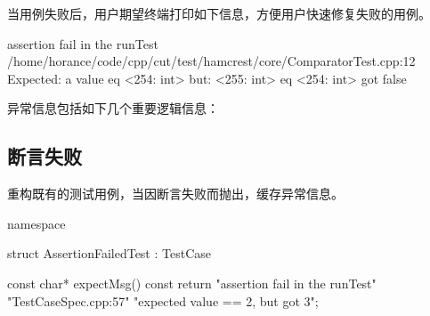 \begin{content}

当用例失败后，用户期望终端打印如下信息，方便用户快速修复失败的用例。

\begin{leftbar}
 \begin{c++}[caption={\ttfamily{include/mars/except/TestFailure.h}}]
assertion fail in the runTest
/home/horance/code/cpp/cut/test/hamcrest/core/ComparatorTest.cpp:12
Expected: a value eq <254: int>
     but: <255: int> eq <254: int> got false
 \end{c++}
\end{leftbar}

异常信息包括如下几个重要逻辑信息：

\begin{enum}
    \begin{enum}
    \end{enum}
    \begin{enum}
    \end{enum}
    \begin{enum}
    \end{enum}
\end{enum}

\subsection{断言失败}

重构既有的测试用例，当因断言失败而抛出，缓存异常信息。

\begin{leftbar}
 \begin{c++}[caption={\ttfamily{test/mars/core/TestCaseSpec.cc}}]
namespace {
  struct AssertionFailedTest : TestCase {
    const char* expectMsg() const {
      return "assertion fail in the runTest\n"
              "TestCaseSpec.cpp:57\n"
              "expected value == 2, but got 3";
    }

}}
\end{c++}
\end{leftbar}
\end{content}
